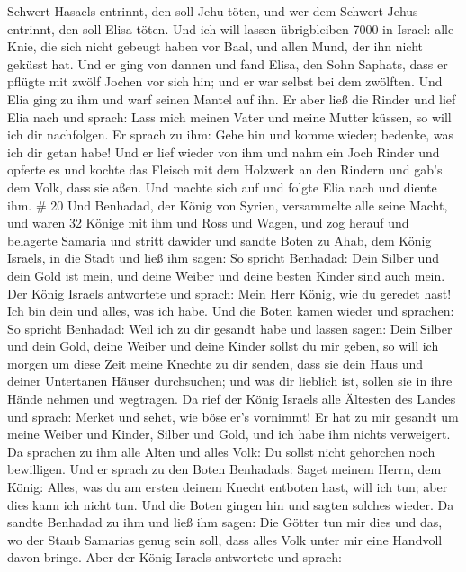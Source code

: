 Schwert Hasaels entrinnt, den soll Jehu töten, und wer dem Schwert Jehus
entrinnt, den soll Elisa töten.  Und ich will lassen
übrigbleiben 7000 in Israel: alle Knie, die sich nicht gebeugt haben vor
Baal, und allen Mund, der ihn nicht geküsst hat.  Und er
ging von dannen und fand Elisa, den Sohn Saphats, dass er pflügte mit
zwölf Jochen vor sich hin; und er war selbst bei dem zwölften. Und Elia
ging zu ihm und warf seinen Mantel auf ihn.  Er aber ließ
die Rinder und lief Elia nach und sprach: Lass mich meinen Vater und
meine Mutter küssen, so will ich dir nachfolgen. Er sprach zu ihm: Gehe
hin und komme wieder; bedenke, was ich dir getan habe!  Und
er lief wieder von ihm und nahm ein Joch Rinder und opferte es und
kochte das Fleisch mit dem Holzwerk an den Rindern und gab's dem Volk,
dass sie aßen. Und machte sich auf und folgte Elia nach und diente ihm.
\# 20  Und Benhadad, der König von Syrien, versammelte alle
seine Macht, und waren 32 Könige mit ihm und Ross und Wagen, und zog
herauf und belagerte Samaria und stritt dawider  und sandte
Boten zu Ahab, dem König Israels, in die Stadt  und ließ ihm
sagen: So spricht Benhadad: Dein Silber und dein Gold ist mein, und
deine Weiber und deine besten Kinder sind auch mein.  Der
König Israels antwortete und sprach: Mein Herr König, wie du geredet
hast! Ich bin dein und alles, was ich habe.  Und die Boten
kamen wieder und sprachen: So spricht Benhadad: Weil ich zu dir gesandt
habe und lassen sagen: Dein Silber und dein Gold, deine Weiber und deine
Kinder sollst du mir geben,  so will ich morgen um diese
Zeit meine Knechte zu dir senden, dass sie dein Haus und deiner
Untertanen Häuser durchsuchen; und was dir lieblich ist, sollen sie in
ihre Hände nehmen und wegtragen.  Da rief der König Israels
alle Ältesten des Landes und sprach: Merket und sehet, wie böse er's
vornimmt! Er hat zu mir gesandt um meine Weiber und Kinder, Silber und
Gold, und ich habe ihm nichts verweigert.  Da sprachen zu
ihm alle Alten und alles Volk: Du sollst nicht gehorchen noch
bewilligen.  Und er sprach zu den Boten Benhadads: Saget
meinem Herrn, dem König: Alles, was du am ersten deinem Knecht entboten
hast, will ich tun; aber dies kann ich nicht tun. Und die Boten gingen
hin und sagten solches wieder.  Da sandte Benhadad zu ihm
und ließ ihm sagen: Die Götter tun mir dies und das, wo der Staub
Samarias genug sein soll, dass alles Volk unter mir eine Handvoll davon
bringe.  Aber der König Israels antwortete und sprach:
